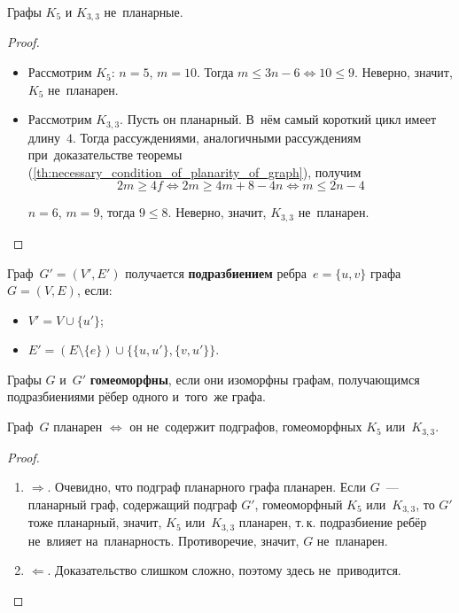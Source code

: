 \begin{theorem}
Графы $K_5$ и $K_{3,3}$ не~планарные.
\end{theorem}
\begin{proof}
\begin{itemize}
	\item Рассмотрим $K_5$: $n = 5$, $m = 10$.
	Тогда $m \leqslant 3n - 6 \Leftrightarrow 10 \leqslant 9$.	
	Неверно, значит, $K_5$ не~планарен.
	\item Рассмотрим $K_{3,3}$.
	Пусть он планарный.
	В~нём самый короткий цикл имеет длину~$4$.
	Тогда рассуждениями, аналогичными рассуждениям при~доказательстве теоремы (\ref{th:necessary_condition_of_planarity_of_graph}), получим
	\begin{equation*}
	2m \geqslant 4f \Leftrightarrow 2m \geqslant 4m + 8 - 4n \Leftrightarrow m \leqslant 2n - 4
	\end{equation*}
	
	$n = 6$, $m = 9$, тогда $9 \leqslant 8$.
	Неверно, значит, $K_{3,3}$ не~планарен.
\end{itemize}
\end{proof}

Граф~$G' = (V', E')$ получается \textbf{подразбиением} ребра~$e = \{ u, v \}$ графа~$G = (V, E)$, если:
\begin{itemize}
	\item $V' = V \cup \{ u' \}$;
	\item $E' = (E \setminus \{ e \}) \cup \{ \{ u, u' \}, \{ v, u' \} \}$.
\end{itemize}

Графы $G$ и~$G'$ \textbf{гомеоморфны}, если они изоморфны графам, получающимся подразбиениями рёбер одного и~того~же графа.

\begin{theorem}
Граф~$G$ планарен $\Leftrightarrow$ он не~содержит подграфов, гомеоморфных $K_5$ или~$K_{3,3}$.
\end{theorem}
\begin{proof}
\begin{enumerate}
	\item $\Rightarrow$. Очевидно, что подграф планарного графа планарен.
	Если $G$~--- планарный граф, содержащий подграф $G'$, гомеоморфный $K_5$ или~$K_{3,3}$, то $G'$ тоже планарный, значит, $K_5$ или~$K_{3,3}$ планарен, т.\,к. подразбиение ребёр не~влияет на~планарность.
	Противоречие, значит, $G$ не~планарен.
	\item $\Leftarrow$. Доказательство слишком сложно, поэтому здесь не~приводится.
\end{enumerate}
\end{proof}